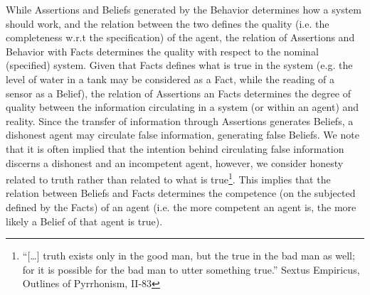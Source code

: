 While Assertions and Beliefs generated by the Behavior determines how a system should work, and the
relation between the two defines the quality (i.e. the completeness w.r.t the specification) of the agent, the relation of
Assertions and Behavior with Facts determines the quality with respect to the
nominal (specified) system.  Given that Facts defines what is true in the
system (e.g. the level of water in a tank may be considered as a Fact, while
the reading of a sensor as a Belief), the relation of Assertions an Facts
determines the degree of quality between the information circulating in a
system (or within an agent) and reality.
Since the transfer of information through Assertions
generates Beliefs, a dishonest agent may circulate false information,
generating false Beliefs.  We note that it is often implied that the intention behind
circulating false information discerns a dishonest and an incompetent agent,
however, we consider honesty related to truth rather than related to what is
true\footnote{``[\ldots] truth exists only in the good man, but the true in the bad
man as well; for it is possible for the bad man to utter something true.''
Sextus Empiricus, Outlines of Pyrrhonism, II-83\autocite{Empiricus1990Pyrrhonism}}.  This implies that the
relation between Beliefs and Facts determines the competence (on the subjected
defined by the Facts) of an agent (i.e. the more competent an agent is, the
more likely a Belief of that agent is true).



